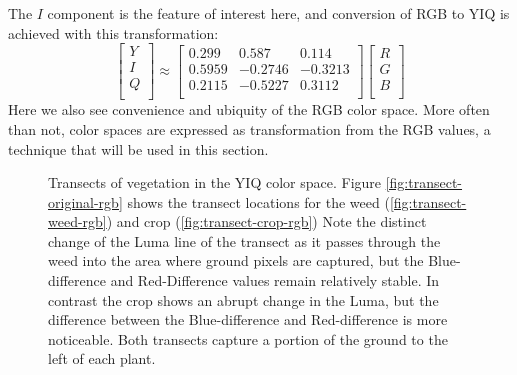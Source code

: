 \documentclass[letterpaper]{report}
\begin{document}
The $I$ component is the feature of interest here, and conversion of RGB to YIQ is achieved with this transformation:
\begin{equation}
	\begin{bmatrix}
	Y \\[0.3em]
	I \\[0.3em]
	Q \\[0.3em]
	\end{bmatrix}
	\approx
	\begin{bmatrix}
	0.299 & 0.587 & 0.114 \\[0.3em]
	0.5959 & -0.2746 & -0.3213\\[0.3em]
	0.2115 & -0.5227 & 0.3112 \\[0.3em]
	\end{bmatrix}
	\begin{bmatrix}
	R \\[0.3em]
	G \\[0.3em]
	B \\[0.3em]
	\end{bmatrix}	
\end{equation}
Here we also see convenience and ubiquity of the RGB color space. More often than not, color spaces are expressed as transformation from the RGB values, a technique that will be used in this section.


\begin{figure}[h]
	\centering
	\hfill
	\hfill
	\caption[YIQ Transects]{Transects of vegetation in the YIQ color space. Figure \ref{fig:transect-original-rgb} shows the transect locations for the weed (\ref{fig:transect-weed-rgb}) and crop (\ref{fig:transect-crop-rgb}) Note the distinct change of the Luma line of the transect as it passes through the weed into the area where ground pixels are captured, but the Blue-difference and Red-Difference values remain relatively stable.  In contrast the crop shows an abrupt change in the Luma, but the difference between the Blue-difference and Red-difference is more noticeable. Both transects capture a portion of the ground to the left of each plant.}
	\label{fig:transects-yiq}
\end{figure}
\end{document}
